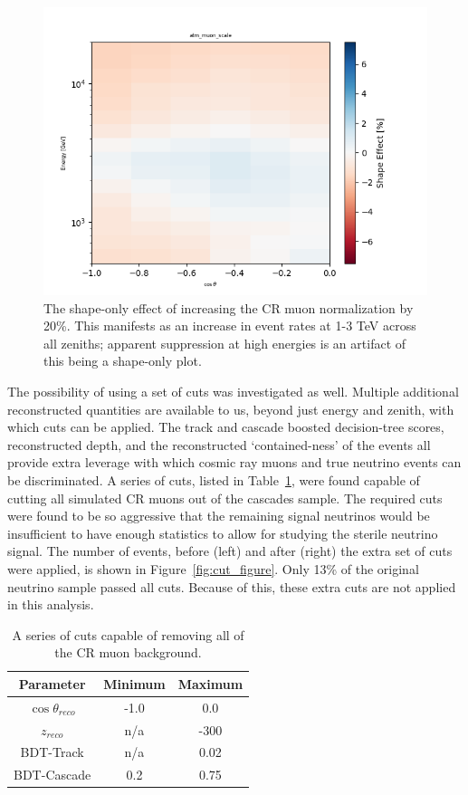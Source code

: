 \documentclass[main.tex]{subfiles}
\begin{document}
\begin{figure}
    \centering
    \includegraphics[width=0.8\linewidth]{figures/atm_muon_scale.png}
    \caption{The shape-only effect of increasing the CR muon normalization by 20\%. This manifests as an increase in event rates at 1-3 TeV across all zeniths; apparent suppression at high energies is an artifact of this being a shape-only plot.}\label{fig:muon_shape}
\end{figure}

The possibility of using a set of cuts was investigated as well. 
Multiple additional reconstructed quantities are available to us, beyond just energy and zenith, with which cuts can be applied. 
The track and cascade boosted decision-tree scores, reconstructed depth, and the reconstructed `contained-ness' of the events all provide extra leverage with which cosmic ray muons and true neutrino events can be discriminated.
A series of cuts, listed in Table~\ref{tab:cut_table}, were found capable of cutting all simulated CR muons out of the cascades sample.
The required cuts were found to be so aggressive that the remaining signal neutrinos would be insufficient to have enough statistics to allow for studying the sterile neutrino signal.
The number of events, before (left) and after (right) the extra set of cuts were applied, is shown in Figure~\ref{fig:cut_figure}.
Only 13\% of the original neutrino sample passed all cuts. 
Because of this, these extra cuts are not applied in this analysis. 

\begin{table}
    \centering
    \begin{tabular}{c|cc}\rowcolor{blue!25}
        Parameter & Minimum & Maximum \\\hline
        $\cos\theta_{reco}$ & -1.0 & 0.0 \\
        $z_{reco}$ & n/a & -300 \\
        BDT-Track & n/a & 0.02 \\
        BDT-Cascade & 0.2 & 0.75
    \end{tabular}
    \caption{A series of cuts capable of removing all of the CR muon background.}\label{tab:cut_table}
\end{table}
\end{document}
